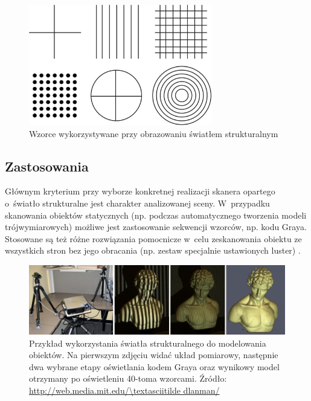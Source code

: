 \begin{figure}[h!]
\centering
\includegraphics[width=8cm]{../../Common/img/struct_patterns}
\caption[Wzorce wykorzystywane przy obrazowaniu światłem strukturalnym]
{Wzorce wykorzystywane przy obrazowaniu światłem strukturalnym}
\label{fig:struct_patterns}
\end{figure}

\subsection{Zastosowania}

Głównym kryterium przy wyborze konkretnej realizacji skanera opartego o~światło
strukturalne jest charakter analizowanej sceny. W~przypadku skanowania obiektów
statycznych (np. podczas automatycznego tworzenia modeli trójwymiarowych)
możliwe jest zastosowanie sekwencji wzorców, np. kodu Graya. Stosowane są też
różne rozwiązania pomocnicze w~celu zeskanowania obiektu ze wszystkich stron bez
jego obracania (np. zestaw specjalnie ustawionych luster) \cite{LanmanCT07}.

\begin{figure}[!ht]
\centering
\includegraphics[width=14cm]{../../Common/img/struct_all}
\caption[Przykład wykorzystania światła strukturalnego do modelowania obiektów]
{Przykład wykorzystania światła strukturalnego do modelowania obiektów. Na
pierwszym zdjęciu widać układ pomiarowy, następnie dwa wybrane etapy oświetlania
kodem Graya oraz wynikowy model otrzymany po oświetleniu 40-toma wzorcami.
Źródło: \url{http://web.media.mit.edu/\textasciitilde dlanman/}}
\label{fig:struct_all}
\end{figure}

